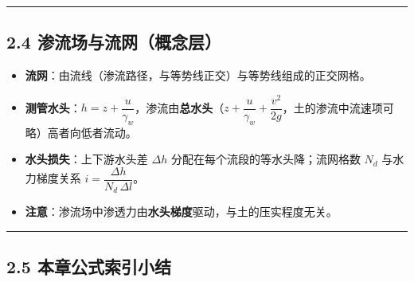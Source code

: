 \documentclass[
]{article}
\providecommand{\tightlist}{%
  \setlength{\itemsep}{0pt}\setlength{\parskip}{0pt}}
\begin{document}
\begin{center}\rule{0.5\linewidth}{0.5pt}\end{center}

\subsection{2.4
渗流场与流网（概念层）}\label{ux6e17ux6d41ux573aux4e0eux6d41ux7f51ux6982ux5ff5ux5c42}

\begin{itemize}
\tightlist
\item
  \textbf{流网}：由流线（渗流路径，与等势线正交）与等势线组成的正交网格。
\item
  \textbf{测管水头}：\(h= z + \dfrac{u}{\gamma_w}\)，渗流由\textbf{总水头}（\(z+\dfrac{u}{\gamma_w}+\dfrac{v^2}{2g}\)，土的渗流中流速项可略）高者向低者流动。
\item
  \textbf{水头损失}：上下游水头差 \(\Delta h\)
  分配在每个流段的等水头降；流网格数 \(N_d\) 与水力梯度关系
  \(i=\dfrac{\Delta h}{N_d\,\Delta l}\)。
\item
  \textbf{注意}：渗流场中渗透力由\textbf{水头梯度}驱动，与土的压实程度无关。
\end{itemize}

\begin{center}\rule{0.5\linewidth}{0.5pt}\end{center}

\subsection{2.5
本章公式索引小结}\label{ux672cux7ae0ux516cux5f0fux7d22ux5f15ux5c0fux7ed3-1}
\end{document}
